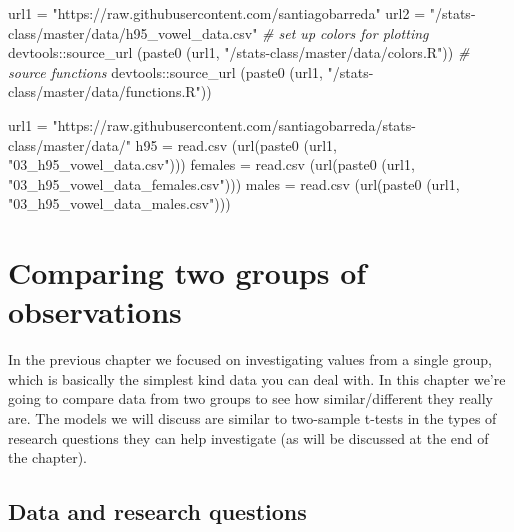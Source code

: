 \documentclass[
]{book}
\newenvironment{Shaded}{\begin{snugshade}}{\end{snugshade}}
\newcommand{\CommentTok}[1]{\textcolor[rgb]{0.56,0.35,0.01}{\textit{#1}}}
\newcommand{\FunctionTok}[1]{\textcolor[rgb]{0.00,0.00,0.00}{#1}}
\newcommand{\NormalTok}[1]{#1}
\newcommand{\OtherTok}[1]{\textcolor[rgb]{0.56,0.35,0.01}{#1}}
\newcommand{\SpecialCharTok}[1]{\textcolor[rgb]{0.00,0.00,0.00}{#1}}
\newcommand{\StringTok}[1]{\textcolor[rgb]{0.31,0.60,0.02}{#1}}
\begin{document}
\begin{Shaded}
\begin{Highlighting}[]
\NormalTok{url1 }\OtherTok{=} \StringTok{"https://raw.githubusercontent.com/santiagobarreda"}
\NormalTok{url2 }\OtherTok{=} \StringTok{"/stats{-}class/master/data/h95\_vowel\_data.csv"}
\CommentTok{\# set up colors for plotting}
\NormalTok{devtools}\SpecialCharTok{::}\FunctionTok{source\_url}\NormalTok{ (}\FunctionTok{paste0}\NormalTok{ (url1, }\StringTok{"/stats{-}class/master/data/colors.R"}\NormalTok{))}
\CommentTok{\# source functions}
\NormalTok{devtools}\SpecialCharTok{::}\FunctionTok{source\_url}\NormalTok{ (}\FunctionTok{paste0}\NormalTok{ (url1, }\StringTok{"/stats{-}class/master/data/functions.R"}\NormalTok{))}

\NormalTok{url1 }\OtherTok{=} \StringTok{"https://raw.githubusercontent.com/santiagobarreda/stats{-}class/master/data/"}
\NormalTok{h95 }\OtherTok{=} \FunctionTok{read.csv}\NormalTok{ (}\FunctionTok{url}\NormalTok{(}\FunctionTok{paste0}\NormalTok{ (url1, }\StringTok{"03\_h95\_vowel\_data.csv"}\NormalTok{)))}
\NormalTok{females }\OtherTok{=} \FunctionTok{read.csv}\NormalTok{ (}\FunctionTok{url}\NormalTok{(}\FunctionTok{paste0}\NormalTok{ (url1, }\StringTok{"03\_h95\_vowel\_data\_females.csv"}\NormalTok{)))}
\NormalTok{males }\OtherTok{=} \FunctionTok{read.csv}\NormalTok{ (}\FunctionTok{url}\NormalTok{(}\FunctionTok{paste0}\NormalTok{ (url1, }\StringTok{"03\_h95\_vowel\_data\_males.csv"}\NormalTok{)))}
\end{Highlighting}
\end{Shaded}

\hypertarget{comparing-two-groups-of-observations}{%
\chapter{Comparing two groups of observations}\label{comparing-two-groups-of-observations}}

In the previous chapter we focused on investigating values from a single group, which is basically the simplest kind data you can deal with. In this chapter we're going to compare data from two groups to see how similar/different they really are. The models we will discuss are similar to two-sample t-tests in the types of research questions they can help investigate (as will be discussed at the end of the chapter).

\hypertarget{data-and-research-questions-2}{%
\section{Data and research questions}\label{data-and-research-questions-2}}
\end{document}
